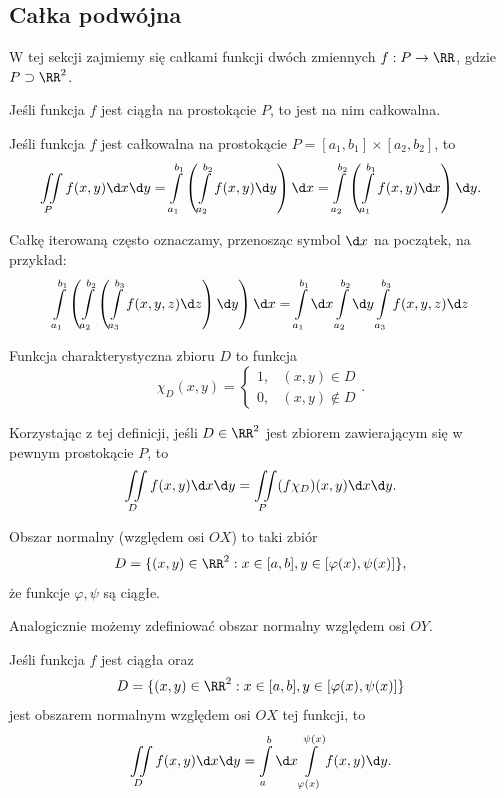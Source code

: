 \subsection{Całka podwójna}
W tej sekcji zajmiemy się całkami funkcji dwóch zmiennych $f : P \to \RR$, gdzie $P \supset \RR^2$.

\begin{theorem}
    Jeśli funkcja $f$ jest ciągła na prostokącie $P$, to jest na nim całkowalna.
\end{theorem}

\begin{theorem}[Fubiniego]
    Jeśli funkcja $f$ jest całkowalna na prostokącie $P = [a_1, b_1] \times [a_2, b_2]$, to
    \[ \iint\limits_P f(x, y) \d x \d y = \int\limits_{a_1}^{b_1}\left(\int\limits_{a_2}^{b_2} f(x, y) \d y\right)\d x = \int\limits_{a_2}^{b_2}\left(\int\limits_{a_1}^{b_1} f(x, y) \d x\right)\d y. \]
\end{theorem}

Całkę iterowaną często oznaczamy, przenosząc symbol $\d x$ na początek, na przykład:
\[ \int\limits_{a_1}^{b_1} \left(\int\limits_{a_2}^{b_2} \left(\int\limits_{a_3}^{b_3} f(x, y, z) \d z\right)\d y\right)\d x = \int\limits_{a_1}^{b_1} \d x\int\limits_{a_2}^{b_2} \d y \int\limits_{a_3}^{b_3} f(x, y, z) \d z \]

\begin{definition}
    Funkcja charakterystyczna zbioru $D$ to funkcja
    \[ \chi_D(x, y) = \begin{cases}
        1, & (x, y) \in D \\
        0, & (x, y) \notin D
    \end{cases}. \]
\end{definition}

Korzystając z tej definicji, jeśli $D \in \RR^2$ jest zbiorem zawierającym się w pewnym prostokącie $P$, to
\[ \iint\limits_D f(x, y) \d x \d y = \iint\limits_P (f\chi_D)(x, y) \d x \d y. \]

\begin{definition}
    Obszar normalny (względem osi $OX$) to taki zbiór
    \[ D = \{(x, y) \in \RR^2 : x \in [a, b], y \in [\varphi(x), \psi(x)]\}, \]
    że funkcje $\varphi, \psi$ są ciągłe.
\end{definition}

Analogicznie możemy zdefiniować obszar normalny względem osi $OY$.

\begin{theorem}
    Jeśli funkcja $f$ jest ciągła oraz
    \[ D = \{(x, y) \in \RR^2 : x \in [a, b], y \in [\varphi(x), \psi(x)]\} \]
    jest obszarem normalnym względem osi $OX$ tej funkcji, to
    \[ \iint\limits_D f(x, y) \d x \d y = \int\limits_a^b \d x \int\limits_{\varphi(x)}^{\psi(x)} f(x, y) \d y. \]
\end{theorem}


